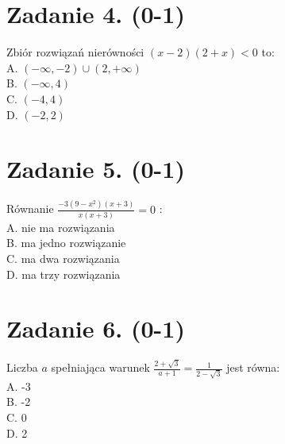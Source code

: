 \documentclass[10pt]{article}
\begin{document}
\section*{Zadanie 4. (0-1)}
Zbiór rozwiązań nierówności \((x-2)(2+x)<0\) to:\\
A. \((-\infty,-2) \cup(2,+\infty)\)\\
B. \((-\infty, 4)\)\\
C. \((-4,4)\)\\
D. \((-2,2)\)

\section*{Zadanie 5. (0-1)}
Równanie \(\frac{-3\left(9-x^{2}\right)(x+3)}{x(x+3)}=0\) :\\
A. nie ma rozwiązania\\
B. ma jedno rozwiązanie\\
C. ma dwa rozwiązania\\
D. ma trzy rozwiązania

\section*{Zadanie 6. (0-1)}
Liczba \(a\) spełniająca warunek \(\frac{2+\sqrt{3}}{a+1}=\frac{1}{2-\sqrt{3}}\) jest równa:\\
A. -3\\
B. -2\\
C. 0\\
D. 2
\end{document}
